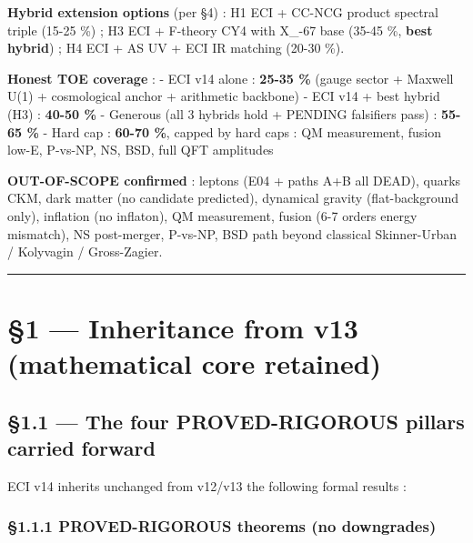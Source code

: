 \documentclass[
  11pt,
  a4paper,
]{article}
\begin{document}
\textbf{Hybrid extension options} (per §4) : H1 ECI + CC-NCG product spectral triple (15-25 \%) ; H3 ECI + F-theory CY4 with X\_-67 base (35-45 \%, \textbf{best hybrid}) ; H4 ECI + AS UV + ECI IR matching (20-30 \%).

\textbf{Honest TOE coverage} :
- ECI v14 alone : \textbf{25-35 \%} (gauge sector + Maxwell U(1) + cosmological anchor + arithmetic backbone)
- ECI v14 + best hybrid (H3) : \textbf{40-50 \%}
- Generous (all 3 hybrids hold + PENDING falsifiers pass) : \textbf{55-65 \%}
- Hard cap : \textbf{60-70 \%}, capped by hard caps : QM measurement, fusion low-E, P-vs-NP, NS, BSD, full QFT amplitudes

\textbf{OUT-OF-SCOPE confirmed} : leptons (E04 + paths A+B all DEAD), quarks CKM, dark matter (no candidate predicted), dynamical gravity (flat-background only), inflation (no inflaton), QM measurement, fusion (6-7 orders energy mismatch), NS post-merger, P-vs-NP, BSD path beyond classical Skinner-Urban / Kolyvagin / Gross-Zagier.

\begin{center}\rule{0.5\linewidth}{0.5pt}\end{center}

\hypertarget{inheritance-from-v13-mathematical-core-retained}{%
\section{§1 --- Inheritance from v13 (mathematical core retained)}\label{inheritance-from-v13-mathematical-core-retained}}

\hypertarget{the-four-proved-rigorous-pillars-carried-forward}{%
\subsection{§1.1 --- The four PROVED-RIGOROUS pillars carried forward}\label{the-four-proved-rigorous-pillars-carried-forward}}

ECI v14 inherits unchanged from v12/v13 the following formal results :

\hypertarget{proved-rigorous-theorems-no-downgrades}{%
\subsubsection{§1.1.1 PROVED-RIGOROUS theorems (no downgrades)}\label{proved-rigorous-theorems-no-downgrades}}
\end{document}
